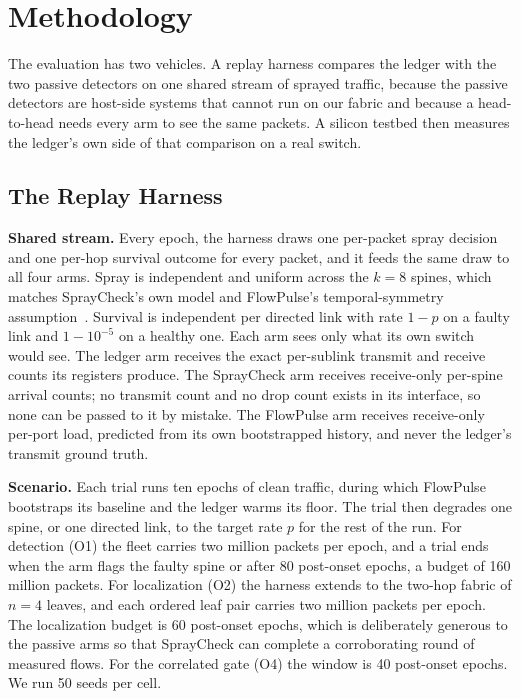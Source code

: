\section{Methodology}
\label{sec:method}

The evaluation has two vehicles. A replay harness compares the ledger with the two passive detectors on one shared stream of sprayed traffic, because the passive detectors are host-side systems that cannot run on our fabric and because a head-to-head needs every arm to see the same packets. A silicon testbed then measures the ledger's own side of that comparison on a real switch.

\subsection{The Replay Harness}

\textbf{Shared stream.} Every epoch, the harness draws one per-packet spray decision and one per-hop survival outcome for every packet, and it feeds the same draw to all four arms. Spray is independent and uniform across the $k=8$ spines, which matches SprayCheck's own model and FlowPulse's temporal-symmetry assumption~\cite{spraycheck,flowpulse}. Survival is independent per directed link with rate $1-p$ on a faulty link and $1-10^{-5}$ on a healthy one. Each arm sees only what its own switch would see. The ledger arm receives the exact per-sublink transmit and receive counts its registers produce. The SprayCheck arm receives receive-only per-spine arrival counts; no transmit count and no drop count exists in its interface, so none can be passed to it by mistake. The FlowPulse arm receives receive-only per-port load, predicted from its own bootstrapped history, and never the ledger's transmit ground truth.

\textbf{Scenario.} Each trial runs ten epochs of clean traffic, during which FlowPulse bootstraps its baseline and the ledger warms its floor. The trial then degrades one spine, or one directed link, to the target rate $p$ for the rest of the run. For detection (O1) the fleet carries two million packets per epoch, and a trial ends when the arm flags the faulty spine or after 80 post-onset epochs, a budget of 160 million packets. For localization (O2) the harness extends to the two-hop fabric of $n=4$ leaves, and each ordered leaf pair carries two million packets per epoch. The localization budget is 60 post-onset epochs, which is deliberately generous to the passive arms so that SprayCheck can complete a corroborating round of measured flows. For the correlated gate (O4) the window is 40 post-onset epochs. We run 50 seeds per cell.

